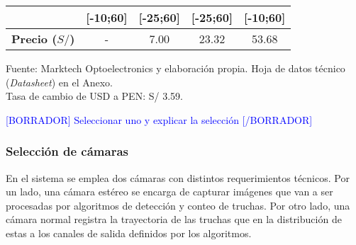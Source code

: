 \begin{mytable}[H]
\begin{tabular}{l|c|c|c|c|}
{		} & [-10;60] & [-25;60] & [-25;60] & [-10;60] \\ \hline
		\multicolumn{1}{|l|}{
			\begin{minipage}{\myforthmaxsizeofcontenttable}	
				\textbf{Precio ($S/$)}
			\end{minipage}
		} & - & 7.00 & 23.32 & 53.68 \\ \hline
	\end{tabular}
	\begin{flushleft}	
		Fuente: Marktech Optoelectronics y elaboración propia. Hoja de datos técnico (\textit{Datasheet}) en el Anexo.\\
		Tasa de cambio de USD a PEN: S/ 3.59.
	\end{flushleft}
\end{mytable}

\textcolor{blue}{[BORRADOR] Seleccionar uno y explicar la selección [/BORRADOR]}

\subsubsection{Selección de cámaras} 

En el sistema se emplea dos cámaras con distintos requerimientos técnicos. Por un lado, una cámara estéreo se encarga de capturar imágenes que van a ser procesadas por algoritmos de detección y conteo de truchas. Por otro lado, una cámara normal registra la trayectoria de las truchas que en la distribución de estas a los canales de salida definidos por los algoritmos. 

